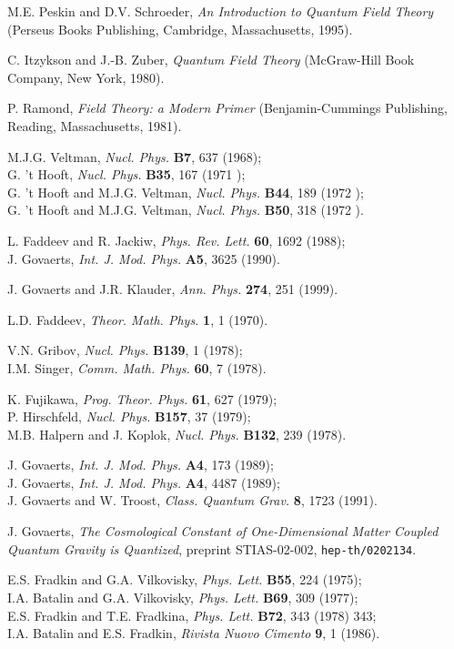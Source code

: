\documentclass[a4paper,11pt]{article}
\begin{document}
\begin{thebibliography}{99}
 M.E. Peskin and D.V. Schroeder, {\sl An Introduction to
Quantum Field Theory\/} (Perseus Books Publishing, Cambridge, Massachusetts,
1995).

 C. Itzykson and J.-B. Zuber, {\sl Quantum Field Theory\/}
(McGraw-Hill Book Company, New York, 1980).

 P. Ramond, {\sl Field Theory: a Modern Primer\/}
(Benjamin-Cummings Pu\-bli\-shing, Reading, Massachusetts, 1981).

M.J.G. Veltman, {\em Nucl. Phys.\/} {\bf B7}, 637 (1968);\\
G. 't Hooft, {\em Nucl. Phys.\/} {\bf B35}, 167 (1971 );\\
G. 't Hooft and M.J.G. Veltman, {\em Nucl. Phys.\/} {\bf B44}, 189 (1972 );\\
G. 't Hooft and M.J.G. Veltman, {\em Nucl. Phys.\/} {\bf B50}, 318 (1972 ).

 L. Faddeev and R. Jackiw, {\em Phys. Rev. Lett.\/} {\bf 60}, 
1692 (1988);\\
J. Govaerts, {\em Int. J. Mod. Phys.\/} {\bf A5}, 3625 (1990).

J. Govaerts and J.R. Klauder, {\em Ann. Phys.\/} {\bf 274}, 251 (1999).

 L.D. Faddeev, {\em Theor. Math. Phys.\/} {\bf 1}, 1 (1970).

V.N. Gribov, {\em Nucl. Phys.\/} {\bf B139}, 1 (1978);\\
I.M. Singer, {\em Comm. Math. Phys.\/} {\bf 60}, 7 (1978).

K. Fujikawa, {\em Prog. Theor. Phys.\/} {\bf 61}, 627 (1979);\\
P. Hirschfeld, {\em Nucl. Phys.\/} {\bf B157}, 37 (1979);\\
M.B. Halpern and J. Koplok, {\sl Nucl. Phys.\/} {\bf B132}, 239 (1978).

J. Govaerts, {\em Int. J. Mod. Phys.} {\bf A4}, 173 (1989);\\
J. Govaerts, {\em Int. J. Mod. Phys.} {\bf A4}, 4487 (1989);\\
J. Govaerts and W. Troost, {\em Class. Quantum Grav.} {\bf 8}, 1723 (1991).

 J. Govaerts, {\sl The Cosmological Constant of One-Dimensional 
Matter Coupled Quantum Gravity is Quantized\/}, 
preprint STIAS-02-002, {\tt hep-th/0202134}.

E.S. Fradkin and G.A. Vilkovisky, {\em Phys. Lett.\/} {\bf B55}, 224 (1975);\\
I.A. Batalin and G.A. Vilkovisky, {\em Phys. Lett.\/} {\bf B69}, 309 (1977);\\
E.S. Fradkin and T.E. Fradkina, {\sl Phys. Lett.\/} {\bf B72}, 343 (1978) 343;\\
I.A. Batalin and E.S. Fradkin, {\sl Rivista Nuovo Cimento\/} {\bf 9}, 1 (1986).


\end{thebibliography}
\end{document}
